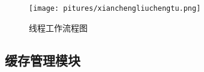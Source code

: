 \begin{figure}[H]
\centering
\texttt{[image: pitures/xianchengliuchengtu.png]}
\caption{线程工作流程图} 
\end{figure}







\subsection{缓存管理模块} 



